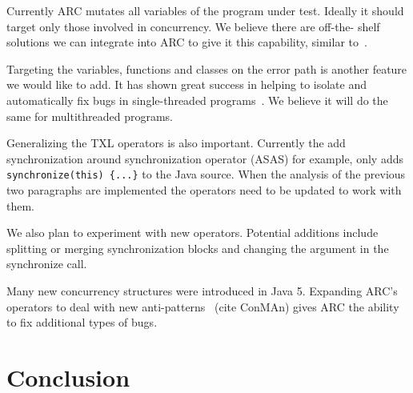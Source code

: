 \documentclass[10pt, conference, compsocconf]{IEEEtran}
\begin{document}
Currently ARC mutates all variables of the program under test. Ideally it
should target only those involved in concurrency. We believe there are off-the-
shelf solutions we can integrate into ARC to give it this capability, similar
to~\cite{CM08, HP00}.

Targeting the variables, functions and classes on the error path is another
feature we would like to add.  It has shown great success in helping to isolate
and automatically fix bugs in single-threaded programs~\cite{FNWG09, NWLF09,
WFGN10, GNFW11}. We believe it will do the same for multithreaded programs.

Generalizing the TXL operators is also important. Currently the add
synchronization around synchronization operator (ASAS) for example, only adds
\texttt{synchronize(this) \{...\}} to the Java source.  When the analysis of
the previous two paragraphs are implemented the operators need to be updated to
work with them.

We also plan to experiment with new operators.  Potential additions include
splitting or merging synchronization blocks and changing the argument in the
synchronize call.  

Many new concurrency structures were introduced in Java 5. Expanding ARC's
operators to deal with new anti-patterns~\cite{BJ09} (cite ConMAn) gives ARC
the ability to fix additional types of bugs.  

\section{Conclusion}










%

\end{document}
